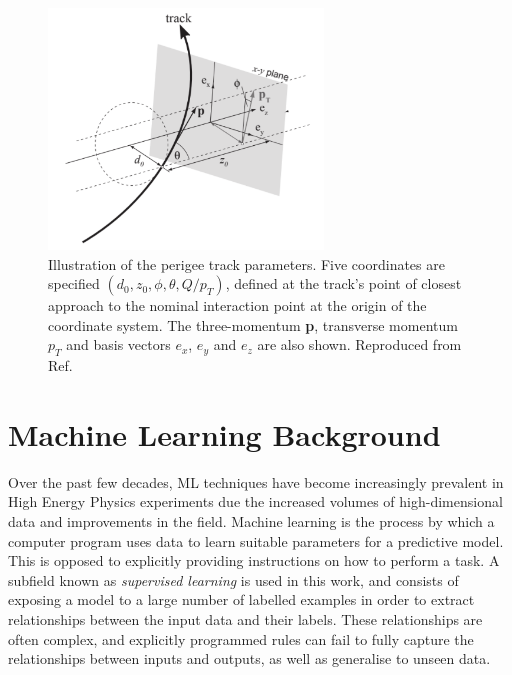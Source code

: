 \begin{figure}[!htbp]
  \centering
  \includegraphics[width=0.65\textwidth]{images/3-track-reconstruction/track_params.pdf}
  \caption{Illustration of the perigee track parameters. Five coordinates are specified $(d_0, z_0, \phi, \theta, Q/p_T)$, defined at the track’s point of closest approach to the nominal interaction point at the origin of the coordinate system. The three-momentum \textbf{p}, transverse momentum $p_T$ and basis vectors $e_x$, $e_y$ and $e_z$ are also shown. Reproduced from Ref. \cite{atlastrackingdocs}
  }
  \label{fig:track-parameters-perigee}
\end{figure}






\section{Machine Learning Background}
\label{ml-background}

Over the past few decades, ML techniques have become increasingly prevalent in High Energy Physics experiments due the increased volumes of high-dimensional data and improvements in the field. Machine learning is the process by which a computer program uses data to learn suitable parameters for a predictive model. This is opposed to explicitly providing instructions on how to perform a task. A subfield known as \textit{supervised learning} is used in this work, and consists of exposing a model to a large number of labelled examples in order to extract relationships between the input data and their labels. These relationships are often complex, and explicitly programmed rules can fail to fully capture the relationships between inputs and outputs, as well as generalise to unseen data.

